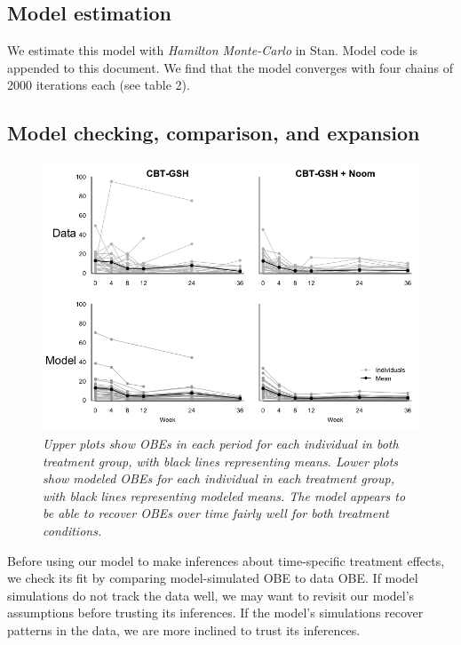 \documentclass[12pt, oneside]{article}
\begin{document}
\subsection{Model estimation}
We estimate this model with \emph{Hamilton Monte-Carlo} in Stan.  Model code is appended to this document.  We find that the model converges with four chains of 2000 iterations each (see table 2).  

\subsection{Model checking, comparison, and expansion}

\begin{figure}
\centering
\includegraphics[width=\textwidth, height=\textheight, keepaspectratio]{ppc_sims.png}
\caption{\emph{Upper plots show OBEs in each period for each individual in both treatment group, with black lines representing means.  Lower plots show modeled OBEs for each individual in each treatment group, with black lines representing modeled means.  The model appears to be able to recover OBEs over time fairly well for both treatment conditions.}}
\end{figure}

Before using our model to make inferences about time-specific treatment effects, we check its fit by comparing model-simulated OBE to data OBE.  If model simulations do not track the data well, we may want to revisit our model's assumptions before trusting its inferences.  If the model's simulations recover patterns in the data, we are more inclined to trust its inferences.  
\\
\end{document}

